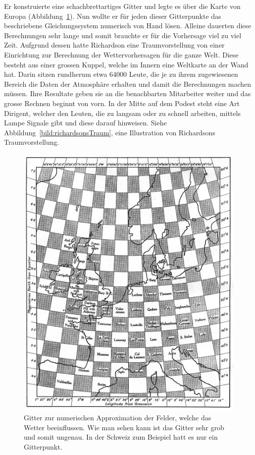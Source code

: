 Er konstruierte eine schachbrettartiges Gitter und legte es über die Karte von Europa (Abbildung~\ref{bild:karteEuropa}).
Nun wollte er für jeden dieser Gitterpunkte das beschriebene Gleichungssystem numerisch von Hand lösen.
Alleine dauerten diese Berechnungen sehr lange und somit brauchte er für die Vorhersage viel zu viel Zeit.
Aufgrund dessen hatte Richardson eine Traumvorstellung von einer Einrichtung zur Berechnung der Wettervorhersagen für die ganze Welt.
Diese besteht aus einer grossen Kuppel, welche im Innern eine Weltkarte an der Wand hat. 
Darin sitzen rundherum etwa 64000 Leute, die je zu ihrem zugewiesenen Bereich die Daten der Atmosphäre erhalten und damit die Berechnungen machen müssen. 
Ihre Resultate geben sie an die benachbarten Mitarbeiter weiter und das grosse Rechnen beginnt von vorn. 
In der Mitte auf dem Podest steht eine Art \glqq Dirigent\grqq, welcher den Leuten, die zu langsam oder zu schnell arbeiten, mittels Lampe Signale gibt und diese darauf hinweisen.
Siehe Abbildung~\ref{bild:richardsonsTraum}, eine Illustration von Richardsons Traumvorstellung.  

\begin{figure}
	\centering
	\includegraphics{eingeteilte_Karte.jpg}
	\caption{Gitter zur numerischen Approximation der Felder, welche das Wetter beeinflussen.
		Wie man sehen kann ist das Gitter sehr grob und somit ungenau.
		In der Schweiz zum Beispiel hatt es nur ein Gitterpunkt. 
		}
	\label{bild:karteEuropa}
\end{figure}

